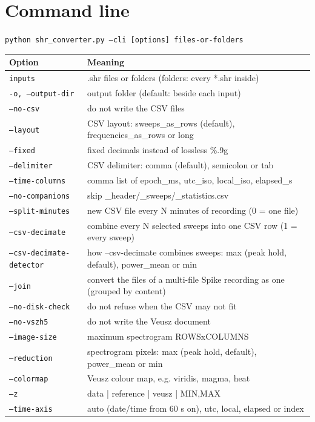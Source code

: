\documentclass[11pt,a4paper]{article}
\newcommand{\code}[1]{\texttt{#1}}
\begin{document}
\section{Command line}
\code{python shr\_converter.py --cli [options] files-or-folders}
\begin{longtable}{p{4.6cm}p{11cm}}
\toprule
\textbf{Option} & \textbf{Meaning}\\
\midrule
\endhead
\texttt{inputs} & .shr files or folders (folders: every *.shr inside)\\
\texttt{-o, --output-dir} & output folder (default: beside each input)\\
\texttt{--no-csv} & do not write the CSV files\\
\texttt{--layout} & CSV layout: sweeps\_as\_rows (default), frequencies\_as\_rows or long\\
\texttt{--fixed} & fixed decimals instead of lossless \%.9g\\
\texttt{--delimiter} & CSV delimiter: comma (default), semicolon or tab\\
\texttt{--time-columns} & comma list of epoch\_ms, utc\_iso, local\_iso, elapsed\_s\\
\texttt{--no-companions} & skip \_header/\_sweeps/\_statistics.csv\\
\texttt{--split-minutes} & new CSV file every N minutes of recording (0 = one file)\\
\texttt{--csv-decimate} & combine every N selected sweeps into one CSV row (1 = every sweep)\\
\texttt{--csv-decimate-detector} & how --csv-decimate combines sweeps: max (peak hold, default), power\_mean or min\\
\texttt{--join} & convert the files of a multi-file Spike recording as one (grouped by content)\\
\texttt{--no-disk-check} & do not refuse when the CSV may not fit\\
\texttt{--no-vszh5} & do not write the Veusz document\\
\texttt{--image-size} & maximum spectrogram ROWSxCOLUMNS\\
\texttt{--reduction} & spectrogram pixels: max (peak hold, default), power\_mean or min\\
\texttt{--colormap} & Veusz colour map, e.g. viridis, magma, heat\\
\texttt{--z} & data | reference | veusz | MIN,MAX\\
\texttt{--time-axis} & auto (date/time from 60 s on), utc, local, elapsed or index\\

\end{longtable}
\end{document}
